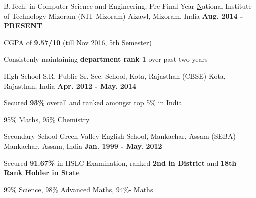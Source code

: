 \begin{cventries}
  \cventry
    {B.Tech. in Computer Science and Engineering, Pre-Final Year}
    {\href{http://nitmz.ac.in/} National Institute of Technology Mizoram (NIT Mizoram)}
    {Aizawl, Mizoram, India}
    {\textbf{Aug. 2014 - PRESENT}}
    {
      \begin{cvitems}
        \item {CGPA of \textbf{9.57/10} (till Nov 2016, 5th Semester)}
        \item {Consistenly maintaining \textbf{department rank 1} over past two years}
      \end{cvitems}
    }
\cventry
    {High School}
    {S.R. Public Sr. Sec. School, Kota, Rajasthan (CBSE)}
    {Kota, Rajasthan, India}
    {\textbf{Apr. 2012 - May. 2014}}
    {
      \begin{cvitems}
        \item {Secured \textbf{93\%} overall and ranked amongst top 5\% in India }
        \item {95\% Maths, 95\% Chemistry }
      \end{cvitems}
    }
 \cventry
    {Secondary School}
    {Green Valley English School, Mankachar, Assam (SEBA)}
    {Mankachar, Assam, India}
    {\textbf{Jan. 1999 - May. 2012}}
    {
      \begin{cvitems}
        \item {Secured \textbf{91.67\%} in HSLC Examination, ranked \textbf{2nd in District} and \textbf{18th Rank Holder in State}}
        \item {99\% Science,  98\% Advanced Maths,  94\%- Maths}
      \end{cvitems}
    }
\end{cventries}
